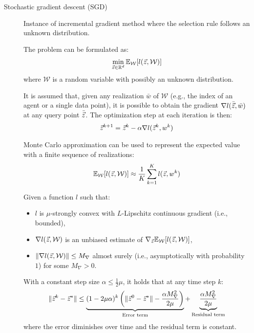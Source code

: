 \begin{description}
    \item[Stochastic gradient descent (SGD)] 
        Instance of incremental gradient method where the selection rule follows an unknown distribution.

        The problem can be formulated as:
        \[ \min_{{\vec{z}} \in \mathbb{R}^d} \mathbb{E}_\mathcal{W}[l({\vec{z}}, \mathcal{W})] \]
        where $\mathcal{W}$ is a random variable with possibly an unknown distribution.

        It is assumed that, given any realization $\bar{w}$ of $\mathcal{W}$ (e.g., the index of an agent or a single data point), it is possible to obtain the gradient $\nabla l(\bar{{\vec{z}}}, \bar{w})$ at any query point $\bar{{\vec{z}}}$. The optimization step at each iteration is then:
        \[ {\vec{z}}^{k+1} = {\vec{z}}^k - \alpha \nabla l({\vec{z}}^k, w^k) \]
        
        \begin{remark}
            Monte Carlo approximation can be used to represent the expected value with a finite sequence of realizations:
            \[ \mathbb{E}_\mathcal{W}[l({\vec{z}}, \mathcal{W})] \approx \frac{1}{K} \sum_{k=1}^{K} l({\vec{z}}, w^k) \]
        \end{remark}

        \begin{theorem} 
            Given a function $l$ such that:
            \begin{itemize}
                \item $l$ is $\mu$-strongly convex with $L$-Lipschitz continuous gradient (i.e., bounded),
                \item $\nabla l({\vec{z}}, \mathcal{W})$ is an unbiased estimate of $\nabla_{\vec{z}} \mathbb{E}_\mathcal{W}[l({\vec{z}}, \mathcal{W})]$,
                \item $\Vert \nabla l({\vec{z}}, \mathcal{W}) \Vert \leq M_\nabla$ almost surely (i.e., asymptotically with probability $1$) for some $M_\nabla > 0$.
            \end{itemize}
            With a constant step size $\alpha \leq \frac{1}{2}\mu$, it holds that at any time step $k$:
            \[ 
                \Vert {\vec{z}}^k - {\vec{z}}^* \Vert \leq 
                \underbrace{(1-2\mu\alpha)^k \left( \Vert {\vec{z}}^0 - {\vec{z}}^* \Vert - \frac{\alpha M_\nabla^2}{2\mu} \right)}_{\text{Error term}} + 
                \underbrace{\frac{\alpha M_\nabla^2}{2\mu}}_{\text{Residual term}} \]
            where the error diminishes over time and the residual term is constant.
        \end{theorem}


\end{description}
